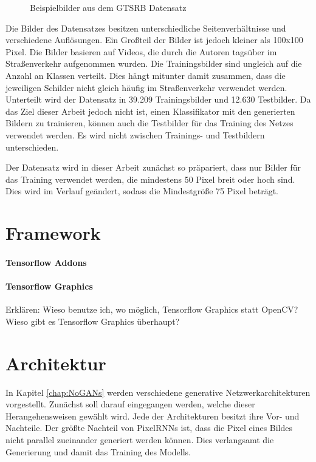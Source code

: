 \begin{figure}[H]
\begin{subfigure}[b]{0.125\textwidth}
    \caption{}
    \label{fig:gtrsb-paper-bsp-image-4}
\end{subfigure}
      \caption{Beispielbilder aus dem \acs{GTSRB} Datensatz \cite{GTSRB}}
      \label{fig:gtrsb-paper-bsp-images}
\end{figure}

Die Bilder des Datensatzes besitzen unterschiedliche Seitenverhältnisse und verschiedene Auflösungen. Ein Großteil der Bilder ist jedoch kleiner als 100x100 Pixel. Die Bilder basieren auf Videos, die durch die Autoren tagsüber im Straßenverkehr aufgenommen wurden. Die Trainingsbilder sind ungleich auf die Anzahl an Klassen verteilt. Dies hängt mitunter damit zusammen, dass die jeweiligen Schilder nicht gleich häufig im Straßenverkehr verwendet werden. Unterteilt wird der Datensatz in 39.209 Trainingsbilder und 12.630 Testbilder. Da das Ziel dieser Arbeit jedoch nicht ist, einen Klassifikator mit den generierten Bildern zu trainieren, können auch die Testbilder für das Training des Netzes verwendet werden. Es wird nicht zwischen Trainings- und Testbildern unterschieden. \cite{GTSRB}

Der Datensatz wird in dieser Arbeit zunächst so präpariert, dass nur Bilder für das Training verwendet werden, die mindestens 50 Pixel breit oder hoch sind. Dies wird im Verlauf geändert, sodass die Mindestgröße 75 Pixel beträgt.
\section{Framework}
\paragraph{Tensorflow Addons}
\paragraph{Tensorflow Graphics}
Erklären: Wieso benutze ich, wo möglich, Tensorflow Graphics statt OpenCV? Wieso gibt es Tensorflow Graphics überhaupt?

\section{Architektur}
In Kapitel \ref{chap:NoGANs} werden verschiedene generative Netzwerkarchitekturen vorgestellt. Zunächst soll darauf eingegangen werden, welche dieser Herangehensweisen gewählt wird. Jede der Architekturen besitzt ihre Vor- und Nachteile. Der größte Nachteil von \acp{PixelRNN} ist, dass die Pixel eines Bildes nicht parallel zueinander generiert werden können. Dies verlangsamt die Generierung und damit das Training des Modells.

